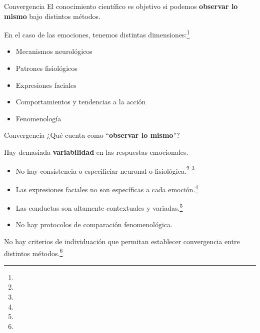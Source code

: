 \documentclass[%
  9pt,
  spanish, %
  ignorenonframetext,
  aspectratio=169, %
]{beamer}
\providecommand{\tightlist}{}
\begin{document}
\begin{frame}{Convergencia}
  \label{convergencia}
  El conocimiento científico es objetivo si podemos \textbf{observar lo
  mismo} bajo distintos métodos.

  \pause

  En el caso de las emociones, tenemos distintas
  dimensiones:\footnote[frame]{}

  \pause

  \begin{itemize}
      \tightlist
    \item
      Mecanismos neurológicos \pause
    \item
      Patrones fisiológicos \pause
    \item
      Expresiones faciales \pause
    \item
      Comportamientos y tendencias a la acción \pause
    \item
      Fenomenología
  \end{itemize}
\end{frame}

\begin{frame}{Convergencia}
  \label{convergencia-1}
  ¿Qué cuenta como ``\textbf{observar lo mismo}''?

  \pause

  Hay demasiada \textbf{variabilidad} en las respuestas emocionales.

  \pause

  \begin{itemize}
      \tightlist
    \item
      No hay consistencia o especificiar neuronal o
      fisiológica.\footnote[frame]{}
      \footnote[frame]{}
      \pause
    \item
      Las expresiones faciales no son específicas a cada
      emoción.\footnote[frame]{} \pause
    \item
      Las conductas son altamente contextuales y
      variadas.\footnote[frame]{} \pause
    \item
      No hay protocolos de comparación fenomenológica.
  \end{itemize}

  \pause

  No hay criterios de individuación que permitan establecer convergencia
  entre distintos métodos.\footnote[frame]{}
\end{frame}
\end{document}
